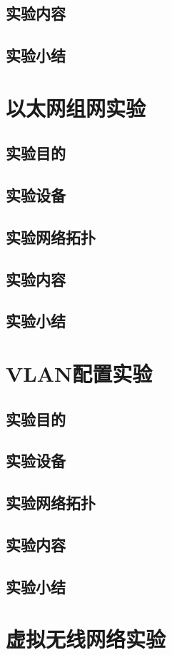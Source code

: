 \documentclass[lang=cn,11pt,a4paper,cite=authoryear]{elegantpaper}
\begin{document}
\subsection{实验内容}
\subsection{实验小结}
\section{以太网组网实验}
\subsection{实验目的}
\subsection{实验设备}
\subsection{实验网络拓扑}
\subsection{实验内容}
\subsection{实验小结}
\section{VLAN配置实验}
\subsection{实验目的}
\subsection{实验设备}
\subsection{实验网络拓扑}
\subsection{实验内容}
\subsection{实验小结}
\section{虚拟无线网络实验}
\end{document}

